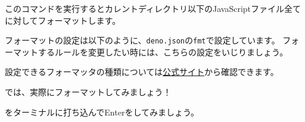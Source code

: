 \begin{Shaded}
\begin{Highlighting}[]
\end{Highlighting}
\end{Shaded}

このコマンドを実行するとカレントディレクトリ以下のJavaScriptファイル全てに対してフォーマットします。

フォーマットの設定は以下のように、\texttt{deno.json}の\texttt{fmt}で設定しています。
フォーマットするルールを変更したい時には、こちらの設定をいじりましょう。

\begin{Shaded}
\begin{Highlighting}[]
   \FunctionTok{\{}
    \FunctionTok{:} \FunctionTok{,} \ErrorTok{//} 
    \FunctionTok{:} \FunctionTok{,} \ErrorTok{//} 
    \FunctionTok{:} \FunctionTok{,} \ErrorTok{//} 
    \FunctionTok{:} \FunctionTok{,} \ErrorTok{//} 
    \FunctionTok{:} \FunctionTok{,} \ErrorTok{//} 
    \FunctionTok{:} \FunctionTok{,}
    \FunctionTok{:} \OtherTok{[}\OtherTok{]}
  \FunctionTok{\}}\ErrorTok{,}
\end{Highlighting}
\end{Shaded}

設定できるフォーマッタの種類については\href{https://deno.land/manual@v1.35.1/tools/formatter}{公式サイト}から確認できます。

では、実際にフォーマットしてみましょう！

\begin{Shaded}
\begin{Highlighting}[]
\end{Highlighting}
\end{Shaded}

をターミナルに打ち込んでEnterをしてみましょう。

\begin{Shaded}
\begin{Highlighting}[]
\end{Highlighting}
\end{Shaded}

